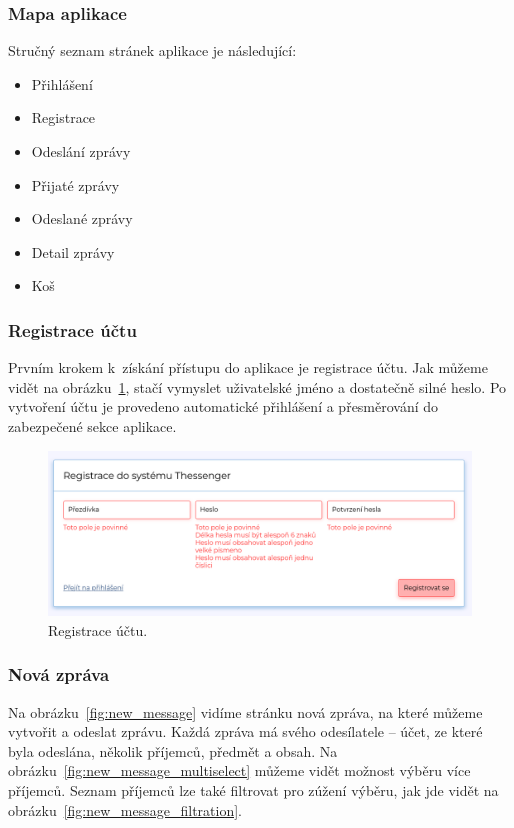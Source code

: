 \documentclass[
  master,
  program=ainf,
  tables=false,
  sourcecodes,
  glossaries,
  index
]{kidiplom}
\begin{document}
\subsubsection{Mapa aplikace}
Stručný seznam stránek aplikace je následující:
\begin{itemize}
  \item Přihlášení
  \item Registrace
  \item Odeslání zprávy
  \item Přijaté zprávy
  \item Odeslané zprávy
  \item Detail zprávy
  \item Koš
\end{itemize}

\subsubsection{Registrace účtu}
Prvním krokem k~získání přístupu do aplikace je registrace účtu. Jak můžeme vidět
na obrázku~\ref{fig:registration}, stačí vymyslet
uživatelské jméno a dostatečně silné heslo. Po vytvoření účtu je provedeno
automatické přihlášení a přesměrování do zabezpečené sekce aplikace.

\begin{figure}[H]
  \centering
  \includegraphics[width=\textwidth]{graphics/thessenger_registration.png}
  \caption{Registrace účtu.}
  \label{fig:registration}
\end{figure}

\subsubsection{Nová zpráva}
Na obrázku~\ref{fig:new_message} vidíme stránku nová zpráva, na které můžeme vytvořit a odeslat zprávu.
Každá zpráva má svého odesílatele -- účet, ze které byla odeslána, několik
příjemců, předmět a obsah. 
Na obrázku~\ref{fig:new_message_multiselect} můžeme vidět možnost výběru
více příjemců. Seznam příjemců lze také filtrovat pro zúžení výběru, jak jde vidět na
obrázku~\ref{fig:new_message_filtration}.
\end{document}
